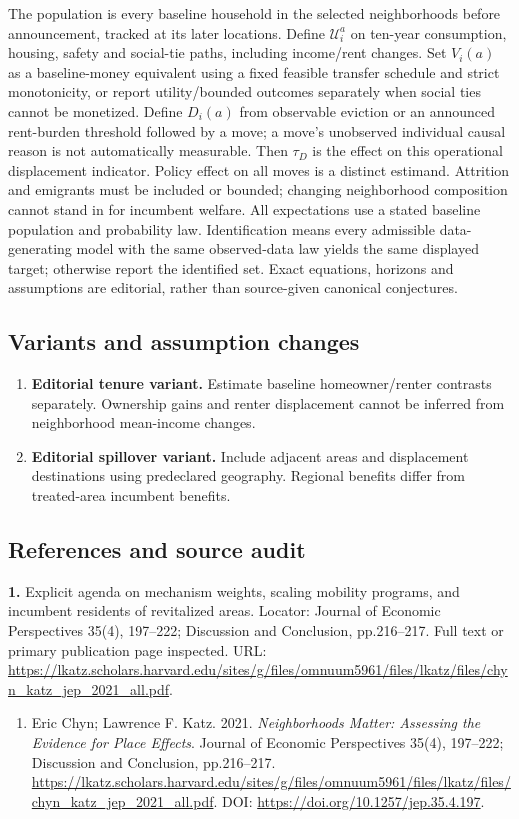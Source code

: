 \documentclass[11pt,a4paper]{article}
\begin{document}
The population is every baseline household in the selected neighborhoods before announcement, tracked at its later locations. Define \(\mathcal U_i^a\) on ten-year consumption, housing, safety and social-tie paths, including income/rent changes. Set \(V_i(a)\) as a baseline-money equivalent using a fixed feasible transfer schedule and strict monotonicity, or report utility/bounded outcomes separately when social ties cannot be monetized. Define \(D_i(a)\) from observable eviction or an announced rent-burden threshold followed by a move; a move's unobserved individual causal reason is not automatically measurable. Then \(\tau_D\) is the effect on this operational displacement indicator. Policy effect on all moves is a distinct estimand. Attrition and emigrants must be included or bounded; changing neighborhood composition cannot stand in for incumbent welfare. All expectations use a stated baseline population and probability law. Identification means every admissible data-generating model with the same observed-data law yields the same displayed target; otherwise report the identified set. Exact equations, horizons and assumptions are editorial, rather than source-given canonical conjectures.
\subsection*{Variants and assumption changes}
\begin{enumerate}
\item \textbf{Editorial tenure variant.} Estimate baseline homeowner/renter contrasts separately. Ownership gains and renter displacement cannot be inferred from neighborhood mean-income changes.
\item \textbf{Editorial spillover variant.} Include adjacent areas and displacement destinations using predeclared geography. Regional benefits differ from treated-area incumbent benefits.
\end{enumerate}
\subsection*{References and source audit}
\textbf{1.} Explicit agenda on mechanism weights, scaling mobility programs, and incumbent residents of revitalized areas. Locator: Journal of Economic Perspectives 35(4), 197–222; Discussion and Conclusion, pp.216–217. Full text or primary publication page inspected. URL: \url{https://lkatz.scholars.harvard.edu/sites/g/files/omnuum5961/files/lkatz/files/chyn_katz_jep_2021_all.pdf}.
\begin{enumerate}\raggedright
\item\hypertarget{definitions:source:30007747:1}{} Eric Chyn; Lawrence F. Katz. 2021. \emph{Neighborhoods Matter: Assessing the Evidence for Place Effects}. Journal of Economic Perspectives 35(4), 197–222; Discussion and Conclusion, pp.216–217.
\url{https://lkatz.scholars.harvard.edu/sites/g/files/omnuum5961/files/lkatz/files/chyn_katz_jep_2021_all.pdf}.
DOI: \url{https://doi.org/10.1257/jep.35.4.197}.
\end{enumerate}
\end{document}
